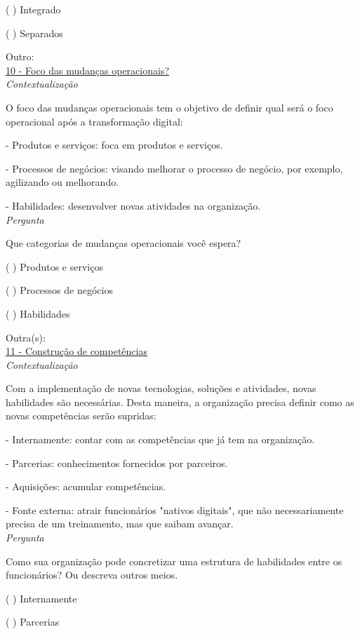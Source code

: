 ( ) Integrado

( ) Separados

Outro:\\


\underline{10 - Foco das mudanças operacionais?}\\

\textit{Contextualização}

O foco das mudanças operacionais tem o objetivo de definir qual será o foco operacional após a transformação digital:


- Produtos e serviços: foca em produtos e serviços.

- Processos de negócios: visando melhorar o processo de negócio, por exemplo, agilizando ou melhorando.

- Habilidades: desenvolver novas atividades na organização.\\


\textit{Pergunta}

Que categorias de mudanças operacionais você espera?

( ) Produtos e serviços

( ) Processos de negócios

( ) Habilidades

Outra(s):\\


\underline{11 - Construção de competências}\\

\textit{Contextualização}

Com a implementação de novas tecnologias, soluções e atividades, novas habilidades são necessárias. Desta maneira, a organização precisa definir como as novas competências serão supridas:

- Internamente: contar com as competências que já tem na organização.

- Parcerias: conhecimentos fornecidos por parceiros.

- Aquisições: acumular competências.

- Fonte externa: atrair funcionários "nativos digitais", que não necessariamente precisa de um treinamento, mas que saibam avançar.\\


\textit{Pergunta}

Como sua organização pode concretizar uma estrutura de habilidades entre os funcionários? Ou descreva outros meios.

( ) Internamente

( ) Parcerias

